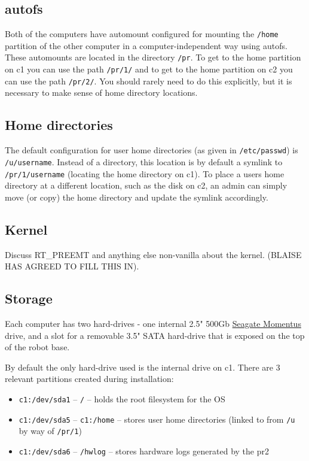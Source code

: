 \subsection{autofs}
Both of the computers have automount configured for mounting the
\texttt{/home} partition of the other computer in a
computer-independent way using autofs. These automounts are located in
the directory \texttt{/pr}. To get to the home partition on c1 you can
use the path \texttt{/pr/1/} and to get to the home partition on c2
you can use the path \texttt{/pr/2/}. You should rarely need to do
this explicitly, but it is necessary to make sense of home directory
locations.

\subsection{Home directories}
The default configuration for user home directories (as given in
\texttt{/etc/passwd}) is \texttt{/u/username}.  Instead of a
directory, this location is by default a symlink to
\texttt{/pr/1/username} (locating the home directory on c1).  To place
a users home directory at a different location, such as the disk on
c2, an admin can simply move (or copy) the home directory and update
the symlink accordingly.

\subsection{Kernel}
Discuss RT\_PREEMT and anything else non-vanilla about the kernel.
(BLAISE HAS AGREED TO FILL THIS IN).

\subsection{Storage}
Each computer has two hard-drives - one internal 2.5" 500Gb
\href{http://www.seagate.com/www/en-us/products/laptops/momentus/momentus_7200.4_g_force/}{Seagate
  Momentus} drive, and a slot for a removable 3.5" SATA hard-drive
that is exposed on the top of the robot base.

By default the only hard-drive used is the internal drive on c1.
There are 3 relevant partitions created during installation:
\begin{itemize}
\item \texttt{c1:/dev/sda1} -- \texttt{/} -- holds the root filesystem
  for the OS
\item \texttt{c1:/dev/sda5} -- \texttt{c1:/home} -- stores user home
  directories (linked to from \texttt{/u} by way of \texttt{/pr/1})
\item \texttt{c1:/dev/sda6} -- \texttt{/hwlog} -- stores hardware logs
  generated by the pr2
\end{itemize}

